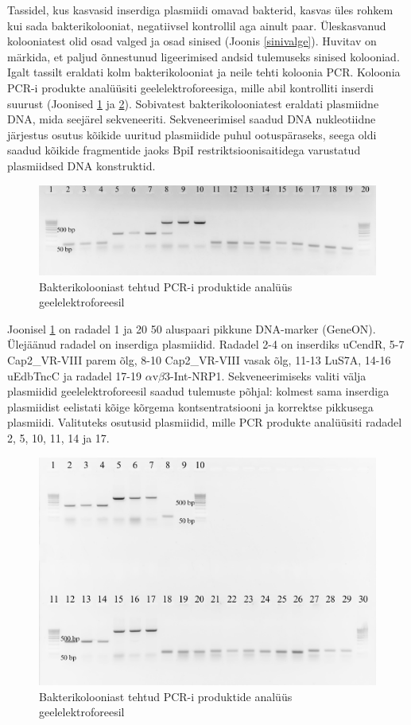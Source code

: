 \documentclass{trkut}%
\begin{document}
Tassidel, kus kasvasid inserdiga plasmiidi omavad bakterid, kasvas üles rohkem kui sada bakterikolooniat, negatiivsel kontrollil aga ainult paar. Üleskasvanud kolooniatest olid osad valged ja osad sinised (Joonis \ref{sinivalge}). Huvitav on märkida, et paljud õnnestunud ligeerimised andsid tulemuseks sinised kolooniad. Igalt tassilt eraldati kolm bakterikolooniat ja neile tehti koloonia PCR. Koloonia PCR-i produkte analüüsiti geelelektroforeesiga, mille abil kontrolliti inserdi suurust (Joonised \ref{colo1} ja \ref{colo2}). Sobivatest bakterikolooniatest eraldati plasmiidne DNA, mida seejärel sekveneeriti. Sekveneerimisel saadud DNA nukleotiidne järjestus osutus kõikide uuritud plasmiidide puhul ootuspäraseks, seega oldi saadud kõikide fragmentide jaoks BpiI restriktsioonisaitidega
varustatud plasmiidsed DNA konstruktid.

\begin{figure}[H]
	\includegraphics[width=14cm]{colopcr11.png}
	\caption{Bakterikolooniast tehtud PCR-i produktide analüüs geelelektroforeesil}
	\label{colo1}
\end{figure}

Joonisel \ref{colo1} on radadel 1 ja 20 50 aluspaari pikkune DNA-marker (GeneON). Ülejäänud radadel on inserdiga plasmiidid. Radadel 2-4 on inserdiks uCendR, 5-7 Cap2\_VR-VIII parem õlg, 8-10 Cap2\_VR-VIII vasak õlg, 11-13 LuS7A, 14-16 uEdbTncC ja radadel 17-19 $\alpha$v$\beta$3-Int-NRP1. Sekveneerimiseks valiti välja plasmiidid geelelektroforeesil saadud tulemuste põhjal: kolmest sama inserdiga plasmiidist eelistati kõige kõrgema kontsentratsiooni ja korrektse pikkusega plasmiidi. Valituteks osutusid plasmiidid, mille PCR produkte analüüsiti radadel 2, 5, 10, 11, 14 ja 17.

\begin{figure}[H]
	\includegraphics[width=14cm]{colopcr21.png}
	\caption{Bakterikolooniast tehtud PCR-i produktide analüüs geelelektroforeesil}
	\label{colo2}
\end{figure}
\end{document}
